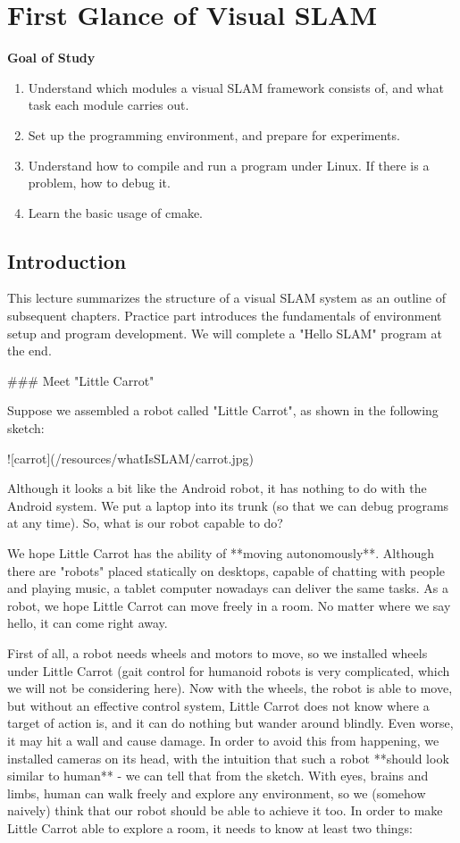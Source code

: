 \chapter{First Glance of Visual SLAM}
\begin{mdframed}
	\textbf{Goal of Study}
	\begin{enumerate}[labelindent=0em,leftmargin=1.5em]
		\item Understand which modules a visual SLAM framework consists of, and what task each module carries out.
		\item Set up the programming environment, and prepare for experiments.
		\item Understand how to compile and run a program under Linux. If there is a problem, how to debug it.
		\item Learn the basic usage of cmake.
	\end{enumerate}
\end{mdframed}

\newpage
\section{Introduction}

This lecture summarizes the structure of a visual SLAM system as an outline of subsequent chapters. Practice part introduces the fundamentals of environment setup and program development. We will complete a "Hello SLAM" program at the end.

### Meet "Little Carrot"

Suppose we assembled a robot called "Little Carrot", as shown in the following sketch:

![carrot](/resources/whatIsSLAM/carrot.jpg)

Although it looks a bit like the Android robot, it has nothing to do with the Android system. We put a laptop into its trunk (so that we can debug programs at any time). So, what is our robot capable to do?

We hope Little Carrot has the ability of **moving autonomously**. Although there are "robots" placed statically on desktops, capable of chatting with people and playing music, a tablet computer nowadays can deliver the same tasks. As a robot, we hope Little Carrot can move freely in a room. No matter where we say hello, it can come right away.

First of all, a robot needs wheels and motors to move, so we installed wheels under Little Carrot (gait control for humanoid robots is very complicated, which we will not be considering here). Now with the wheels, the robot is able to move, but without an effective control system, Little Carrot does not know where a target of action is, and it can do nothing but wander around blindly. Even worse, it may hit a wall and cause damage. In order to avoid this from happening, we installed cameras on its head, with the intuition that such a robot **should look similar to human** - we can tell that from the sketch. With eyes, brains and limbs, human can walk freely and explore any environment, so we (somehow naively) think that our robot should be able to achieve it too. In order to make Little Carrot able to explore a room, it needs to know at least two things:

